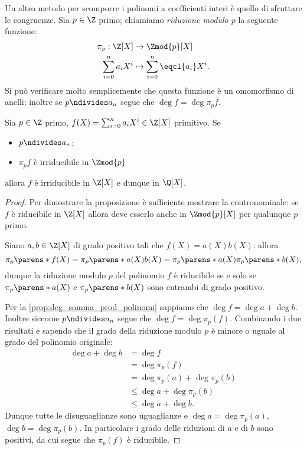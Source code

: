 Un altro metodo per scomporre i polinomi a coefficienti interi è quello di sfruttare le congruenze. Sia $p \in \Z$ primo; chiamiamo \emph{riduzione modulo $p$} la seguente funzione:
\begin{align*}
    \pi_p : \Z[X] &\to \Zmod{p}[X]\\
    \sum_{i=0}^n a_iX^i &\mapsto \sum_{i=0}^n \eqcl{a_i}X^i.
\end{align*}
Si può verificare molto semplicemente che questa funzione è un omomorfismo di anelli; inoltre se $p \ndivides a_n$ segue che $\deg f = \deg \pi_p f$.

\begin{proposition}
    Sia $p \in \Z$ primo, $f(X) = \sum_{i=0}^n a_iX^i \in \Z[X]$ primitivo. Se \begin{itemize}
        \item $p \ndivides a_n$;
        \item $\pi_p f$ è irriducibile in $\Zmod{p}$
    \end{itemize} allora $f$ è irriducibile in $\Z[X]$ e dunque in $\Q[X]$.
\end{proposition}
\begin{proof}
    Per dimostrare la proposizione è sufficiente mostrare la contronominale: se $f$ è riducibile in $\Z[X]$ allora deve esserlo anche in $\Zmod{p}[X]$ per qualunque $p$ primo.

    Siano $a, b \in \Z[X]$ di grado positivo tali che $f(X) = a(X)b(X)$: allora \[
        \pi_p\parens*{f(X)} = \pi_p\parens*{a(X)b(X)} = \pi_p\parens*{a(X)}\pi_p\parens*{b(X)},
    \] dunque la riduzione modulo $p$ del polinomio $f$ è riducibile se e solo se $\pi_p\parens*{a(X)}$ e $\pi_p\parens*{b(X)}$ sono entrambi di grado positivo.

    Per la \autoref{prop:deg_somma_prod_polinomi} sappiamo che $\deg f = \deg a + \deg b$. Inoltre siccome $p \ndivides a_n$ segue che $\deg f = \deg \pi_p(f)$. Combinando i due risultati e sapendo che il grado della riduzione modulo $p$ è minore o uguale al grado del polinomio originale: \begin{align*}
        \deg a + \deg b &= \deg f \\
        &= \deg \pi_p(f) \\
        &= \deg \pi_p(a) + \deg \pi_p(b)\\
        &\leq \deg a + \deg \pi_p(b) \\
        &\leq \deg a + \deg b.
    \end{align*} Dunque tutte le disuguaglianze sono uguaglianze e $\deg a = \deg \pi_p(a)$, $\deg b = \deg \pi_p(b)$. In particolare i grado delle riduzioni di $a$ e di $b$ sono positivi, da cui segue che $\pi_p(f)$ è riducibile.
\end{proof}

